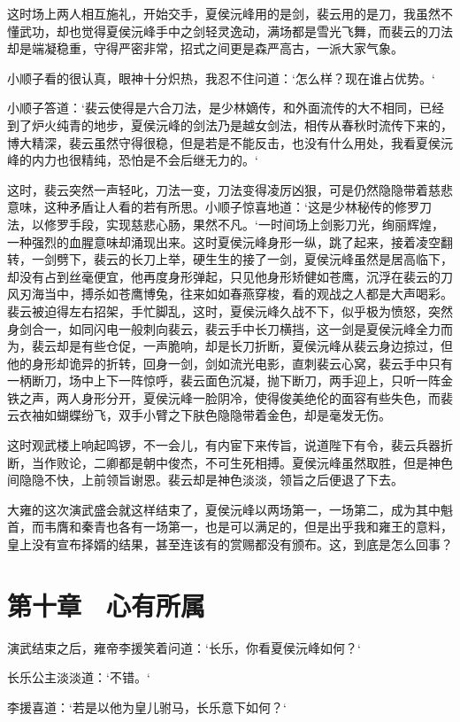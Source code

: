 这时场上两人相互施礼，开始交手，夏侯沅峰用的是剑，裴云用的是刀，我虽然不懂武功，却也觉得夏侯沅峰手中之剑轻灵逸动，满场都是雪光飞舞，而裴云的刀法却是端凝稳重，守得严密非常，招式之间更是森严高古，一派大家气象。

小顺子看的很认真，眼神十分炽热，我忍不住问道：‘怎么样？现在谁占优势。‘

小顺子答道：‘裴云使得是六合刀法，是少林嫡传，和外面流传的大不相同，已经到了炉火纯青的地步，夏侯沅峰的剑法乃是越女剑法，相传从春秋时流传下来的，博大精深，裴云虽然守得很稳，但是若是不能反击，也没有什么用处，我看夏侯沅峰的内力也很精纯，恐怕是不会后继无力的。‘

这时，裴云突然一声轻叱，刀法一变，刀法变得凌厉凶狠，可是仍然隐隐带着慈悲意味，这种矛盾让人看的若有所思。小顺子惊喜地道：‘这是少林秘传的修罗刀法，以修罗手段，实现慈悲心肠，果然不凡。‘一时间场上剑影刀光，绚丽辉煌，一种强烈的血腥意味却涌现出来。这时夏侯沅峰身形一纵，跳了起来，接着凌空翻转，一剑劈下，裴云的长刀上举，硬生生的接了一剑，夏侯沅峰虽然是居高临下，却没有占到丝毫便宜，他再度身形弹起，只见他身形矫健如苍鹰，沉浮在裴云的刀风刃海当中，搏杀如苍鹰博兔，往来如如春燕穿梭，看的观战之人都是大声喝彩。裴云被迫得左右招架，手忙脚乱，这时，夏侯沅峰久战不下，似乎极为愤怒，突然身剑合一，如同闪电一般刺向裴云，裴云手中长刀横挡，这一剑是夏侯沅峰全力而为，裴云却是有些仓促，一声脆响，却是长刀折断，夏侯沅峰从裴云身边掠过，但他的身形却诡异的折转，回身一剑，剑如流光电影，直刺裴云心窝，裴云手中只有一柄断刀，场中上下一阵惊呼，裴云面色沉凝，抛下断刀，两手迎上，只听一阵金铁之声，两人身形分开，夏侯沅峰一脸阴冷，使得俊美绝伦的面容有些失色，而裴云衣袖如蝴蝶纷飞，双手小臂之下肤色隐隐带着金色，却是毫发无伤。

这时观武楼上响起鸣锣，不一会儿，有内宦下来传旨，说道陛下有令，裴云兵器折断，当作败论，二卿都是朝中俊杰，不可生死相搏。夏侯沅峰虽然取胜，但是神色间隐隐不快，上前领旨谢恩。裴云却是神色淡淡，领旨之后便退了下去。

大雍的这次演武盛会就这样结束了，夏侯沅峰以两场第一，一场第二，成为其中魁首，而韦膺和秦青也各有一场第一，也是可以满足的，但是出乎我和雍王的意料，皇上没有宣布择婿的结果，甚至连该有的赏赐都没有颁布。这，到底是怎么回事？

\chapter{第十章　心有所属}

演武结束之后，雍帝李援笑着问道：‘长乐，你看夏侯沅峰如何？‘

长乐公主淡淡道：‘不错。‘

李援喜道：‘若是以他为皇儿驸马，长乐意下如何？‘

